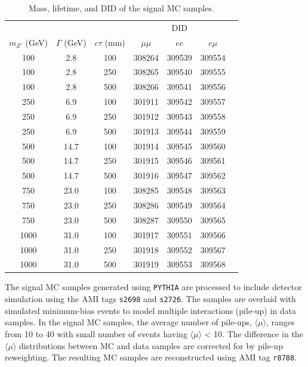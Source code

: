 \begin{table}[!htb]
  \centering
  \begin{tabular}{ c c c c c c c }
    \hline
    \hline
           &   &    & \multicolumn{3}{c}{DID}                 \\
    $m_{Z'}$ (GeV) & $\Gamma$ (GeV) & $c\tau$ (mm) &$\mu\mu$ & $ee$ & $e\mu$ \\
    \hline
    100			   &	2.8         &   100	& 308264	& 309539		&	309554		\\
    100			   &	2.8         &   250	& 308265	& 309540		&	309555		\\
    100			   &	2.8         &   500	& 308266	& 309541		&	309556		\\
    250			   &   6.9	        &   100	& 301911	& 309542		&	309557		\\
    250			   &	6.9         &   250	& 301912	& 309543		&	309558		\\
    250			   &	6.9         &   500	& 301913	& 309544		&	309559		\\
    500			   &   14.7         &   100	& 301914	& 309545		&	309560		\\
    500			   &	14.7        &   250	& 301915	& 309546		&	309561		\\
    500			   &	14.7        &   500	& 301916	& 309547		&	309562		\\
    750			   &	23.0        &   100	& 308285	& 309548		&	309563		\\
    750			   &	23.0        &   250	& 308286	& 309549		&	309564		\\
    750			   &	23.0        &   500	& 308287	& 309550		&	309565		\\
    1000	       &	31.0        &   100	& 301917	& 309551		&	309566		\\
    1000	       &	31.0        &   250	& 301918	& 309552		&	309567		\\
    1000	       &	31.0        &   500	& 301919	& 309553		&	309568		\\
    \hline
    \hline
  \end{tabular}
  \caption{Mass, lifetime, and DID of the signal MC samples.}
  \label{table:MC_signal_samples}
\end{table}

The signal MC samples generated using \texttt{PYTHIA} are processed to include detector simulation using the AMI tags \texttt{s2698} and \texttt{s2726}. The samples are overlaid with simulated minimum-bias events to model multiple interactions (pile-up) in data samples. In the signal MC samples, the average number of pile-ups, $\langle\mu\rangle$, ranges from 10 to 40 with small number of events having $\langle\mu\rangle$ < 10. The difference in the $\langle\mu\rangle$ distributions between MC and data samples are corrected for by pile-up reweighting. The resulting MC samples are reconstructed using AMI tag \texttt{r8788}.

